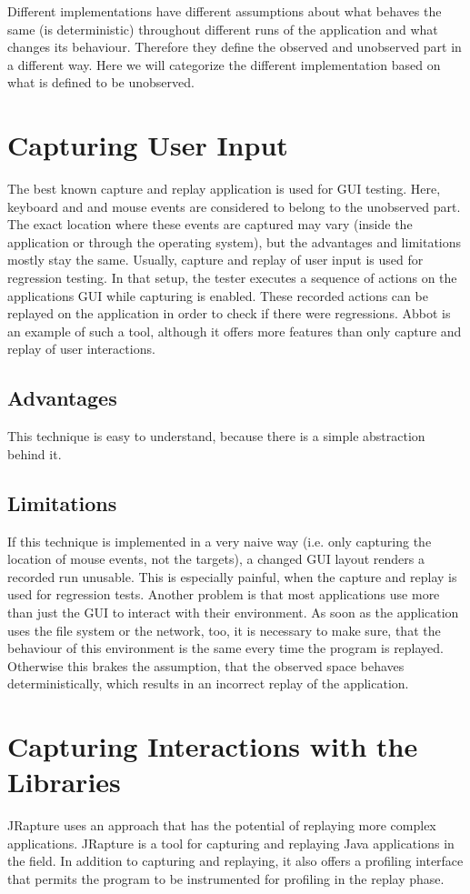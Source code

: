 Different implementations have different assumptions about what behaves the same (is deterministic) throughout different runs of the application and what changes its behaviour. Therefore they define the observed and unobserved part in a different way. Here we will categorize the different implementation based on what is defined to be unobserved.

\section {Capturing User Input}
The best known capture and replay application is used for GUI testing. Here, keyboard and and mouse events are considered to belong to the unobserved part. The exact location where these events are captured may vary (inside the application or through the operating system), but the advantages and limitations mostly stay the same. Usually, capture and replay of user input is used for regression testing. In that setup, the tester executes a sequence of actions on the applications GUI while capturing is enabled. These recorded actions can be replayed on the application in order to check if there were regressions. Abbot \cite{abbot} is an example of such a tool, although it offers more features than only capture and replay of user interactions.
\subsection{Advantages}
This technique is easy to understand, because there is a simple abstraction behind it. 
\subsection{Limitations}
If this technique is implemented in a very naive way (i.e. only capturing the location of mouse events, not the targets), a changed GUI layout renders a recorded run unusable. This is especially painful, when the capture and replay is used for regression tests. Another problem is that most applications use more than just the GUI to interact with their environment. As soon as the application uses the file system or the network, too, it is necessary to make sure, that the behaviour of this environment is the same every time the program is replayed. Otherwise this brakes the assumption, that the observed space behaves deterministically, which results in an incorrect replay of the application.

\section {Capturing Interactions with the Libraries}
JRapture \cite{jrapture} uses an approach that has the potential of replaying more complex applications. JRapture is a tool for capturing and replaying Java applications in the field. In addition to capturing and replaying, it also offers a profiling interface that permits the program to be instrumented for profiling in the replay phase.

